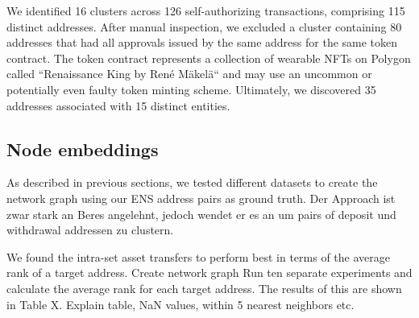 \documentclass[12pt,a4paper,titlepage,oneside,english]{article}
\begin{document}
We identified 16 clusters across 126 self-authorizing transactions, comprising 115 distinct addresses. After manual inspection, we excluded a cluster containing 80 addresses that had all approvals issued by the same address for the same token contract. The token contract represents a collection of wearable NFTs on Polygon called ``Renaissance King by René Mäkelä`` and may use an uncommon or potentially even faulty token minting scheme. \newline Ultimately, we discovered 35 addresses associated with 15 distinct entities.


\subsection{Node embeddings}
As described in previous sections, we tested different datasets to create the network graph using our ENS address pairs as ground truth. Der Approach ist zwar stark an Beres angelehnt, jedoch wendet er es an um pairs of deposit und withdrawal addressen zu clustern.

We found the intra-set asset transfers to perform best in terms of the average rank of a target address. 
Create network graph
Run ten separate experiments and calculate the average rank for each target address. The results of this are shown in Table X. Explain table, NaN values, within 5 nearest neighbors etc.



\end{document}
